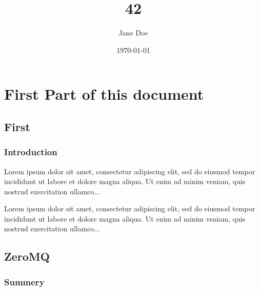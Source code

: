 \documentclass[a4paper,12pt]{report}
\title{42}
\author{Jane Doe}
\date{\today}
\begin{document}
 
\maketitle
 
\renewcommand*\contentsname{Summary}
\tableofcontents

 
\part{First Part of this document}
 
\chapter{First}
 
\section{Introduction}

Lorem ipsum dolor sit amet, consectetur adipiscing elit, sed do 
eiusmod tempor incididunt ut labore et dolore magna aliqua. Ut 
enim ad minim veniam, quis nostrud exercitation ullamco...


Lorem ipsum dolor sit amet, consectetur adipiscing elit, sed do 
eiusmod tempor incididunt ut labore et dolore magna aliqua. Ut 
enim ad minim veniam, quis nostrud exercitation ullamco...

\chapter{ZeroMQ}
 
\section{Summery}
\end{document}
